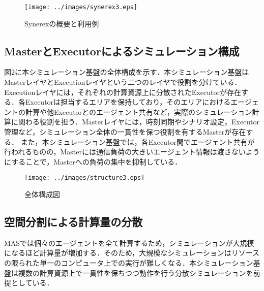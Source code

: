 \documentclass[originalpaper]{jsaiart}     %
\begin{document}
\begin{figure}[t]
    \begin{center}
        \texttt{[image: ../images/synerex3.eps]}
        \label{fig:overall_structure}
    \end{center}
    \caption{Synerexの概要と利用例}
\end{figure}

\subsection{MasterとExecutorによるシミュレーション構成}

図2に本シミュレーション基盤の全体構成を示す．本シミュレーション基盤はMasterレイヤとExecutionレイヤという二つのレイヤで役割を分けている．Executionレイヤには，それぞれの計算資源上に分散されたExecutorが存在する．各Executorは担当するエリアを保持しており，そのエリアにおけるエージェントの計算や他Executorとのエージェント共有など，実際のシミュレーション計算に関わる役割を担う．Masterレイヤには，時刻同期やシナリオ設定，Executor管理など，シミュレーション全体の一貫性を保つ役割を有するMasterが存在する．
また，本シミュレーション基盤では，各Executor間でエージェント共有が行われるものの，Masterには通信負荷の大きいエージェント情報は渡さないようにすることで，Masterへの負荷の集中を抑制している．

\begin{figure}[t]
    \begin{center}
        \texttt{[image: ../images/structure3.eps]}
        \label{fig:overall_structure}
    \end{center}
    \caption{全体構成図}
\end{figure}


\subsection{空間分割による計算量の分散}
MASでは個々のエージェントを全て計算するため，シミュレーションが大規模になるほど計算量が増加する．そのため，大規模なシミュレーションはリソースの限られた単一のコンピュータ上での実行が難しくなる．本シミュレーション基盤は複数の計算資源上で一貫性を保ちつつ動作を行う分散シミュレーションを前提としている．
\end{document}
